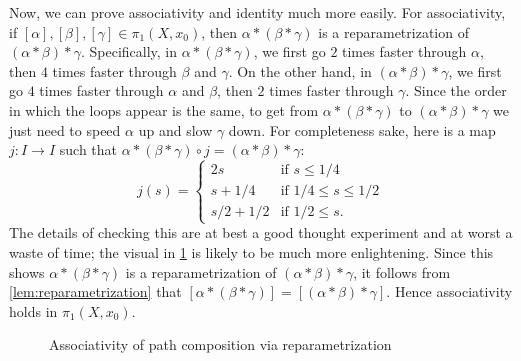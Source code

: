 \documentclass{article}
\theoremstyle{definition}
\theoremstyle{remark}
\numberwithin{figure}{section}
\begin{document}
Now, we can prove associativity and identity much more easily. For associativity, if $[\alpha], [\beta], [\gamma] \in \pi_1(X, x_0)$, then $\alpha * (\beta * \gamma)$ is a reparametrization of $(\alpha * \beta) * \gamma$. Specifically, in $\alpha * (\beta * \gamma)$, we first go $2$ times faster through $\alpha$, then $4$ times faster through $\beta$ and $\gamma$. On the other hand, in $(\alpha * \beta) * \gamma$, we first go $4$ times faster through $\alpha$ and $\beta$, then $2$ times faster through $\gamma$. Since the order in which the loops appear is the same, to get from $\alpha * (\beta * \gamma)$ to $(\alpha * \beta) * \gamma$ we just need to speed $\alpha$ up and slow $\gamma$ down. For completeness sake, here is a map $j : I \to I$ such that $\alpha * (\beta * \gamma) \circ j = (\alpha * \beta) * \gamma$:
\[
j(s) = \begin{cases}
	2s & \text{if } s \leq 1/4\\
	s + 1/4 & \text{if } 1/4 \leq s \leq 1/2\\
	s/2 + 1/2 & \text{if } 1/2 \leq s.
\end{cases}
\]
The details of checking this are at best a good thought experiment and at worst a waste of time; the visual in \cref{fig:reparam visual} is likely to be much more enlightening. Since this shows $\alpha * (\beta * \gamma)$ is a reparametrization of $(\alpha * \beta) * \gamma$, it follows from \cref{lem:reparametrization} that $[\alpha * (\beta * \gamma)] = [(\alpha * \beta) * \gamma]$. Hence associativity holds in $\pi_1(X, x_0)$.

\begin{figure}[h]
	\centering
	\caption{Associativity of path composition via reparametrization}
	\label{fig:reparam visual}
\end{figure}
\end{document}
